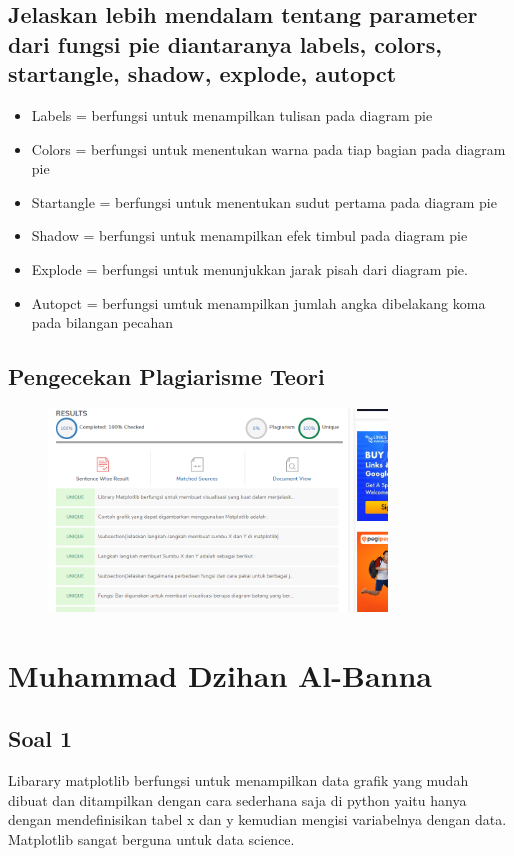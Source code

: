 \subsection{Jelaskan lebih mendalam tentang parameter dari fungsi pie diantaranya labels, colors, startangle, shadow, explode, autopct}
\begin{itemize}
    \item Labels = berfungsi untuk menampilkan tulisan pada diagram pie
    \item Colors = berfungsi untuk menentukan warna pada tiap bagian pada diagram pie
    \item Startangle = berfungsi untuk menentukan sudut pertama pada diagram pie
    \item Shadow = berfungsi untuk menampilkan efek timbul pada diagram pie
    \item Explode = berfungsi untuk menunjukkan jarak pisah dari diagram pie.
    \item Autopct = berfungsi umtuk menampilkan jumlah angka dibelakang koma pada bilangan pecahan
\end{itemize}

\subsection{Pengecekan Plagiarisme Teori}
\begin{figure}[H]
	\includegraphics[width=9cm]{figures/6/Teori/1174096/Plagiat.png}
	\centering
\end{figure}

\section{Muhammad Dzihan Al-Banna}
\subsection{Soal 1}
Libarary matplotlib berfungsi untuk menampilkan data grafik yang mudah dibuat dan ditampilkan dengan cara sederhana saja di python yaitu hanya dengan mendefinisikan tabel x dan y kemudian mengisi variabelnya dengan data. Matplotlib sangat berguna untuk data science.
